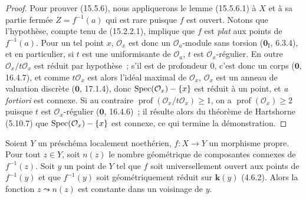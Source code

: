 \begin{proof}
Pour prouver (15.5.6), nous appliquerons le lemme (15.5.6.1) à $X$ et à sa partie fermée $Z=f^{-1}(a)$ qui est rare puisque $f$ est ouvert. Notons que l'hypothèse, compte tenu de (15.2.2.1), implique que $f$ est \emph{plat} aux points de $f^{-1}(a)$. Pour un tel point $x$, $\mathcal O_x$ est donc un $\mathcal O_a$-module sans torsion ($\mathbf{0}_{\mathrm I}$, 6.3.4), et en particulier, si $t$ est une uniformisante de $\mathcal O_a$, $t$ est $\mathcal O_x$-régulier. En outre $\mathcal O_x/t\mathcal O_x$ est réduit par hypothèse~; s'il est de profondeur $0$, c'est donc un corps ($\mathbf{0}$, 16.4.7), et comme $t\mathcal O_x$ est alors l'idéal maximal de $\mathcal O_x$, $\mathcal O_x$ est un anneau de valuation discrète ($\mathbf{0}$, 17.1.4), donc $\operatorname{Spec}(\mathcal O_x)-\{x\}$ est réduit à un point, et \emph{a fortiori} est connexe. Si au contraire $\operatorname{prof}(\mathcal O_x/t\mathcal O_x)\geqslant 1$, on a $\operatorname{prof}(\mathcal O_x)\geqslant 2$ puisque $t$ est $\mathcal O_x$-régulier ($\mathbf{0}$, 16.4.6)~; il résulte alors du théorème de Hartshorne (5.10.7) que $\operatorname{Spec}(\mathcal O_x)-\{x\}$ est connexe, ce qui termine la démonstration.
\end{proof}

\begin{proposition}[15.5.7]
\label{IV.15.5.7-fr}
Soient $Y$ un préschéma localement noethérien, $f:X\to Y$ un morphisme propre. Pour tout $z\in Y$, soit $n(z)$ le nombre géométrique de composantes connexes de $f^{-1}(z)$. Soit $y$ un point de $Y$ tel que $f$ soit universellement ouvert aux points de $f^{-1}(y)$ et que $f^{-1}(y)$ soit géométriquement réduit sur $\boldsymbol{k}(y)$ \textup{(4.6.2)}. Alors la fonction $z\leadsto n(z)$ est constante dans un voisinage de $y$.
\end{proposition}

